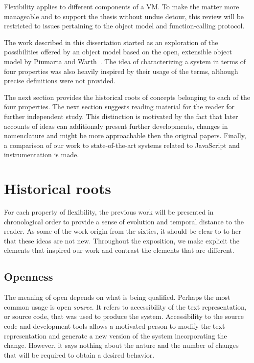 Flexibility applies to different components of a VM. To make the matter more
manageable and to support the thesis without undue detour, this review will be
restricted to issues pertaining to the object model and function-calling
protocol. 

The work described in this dissertation started as an exploration of the
possibilities offered by an object model based on the open, extensible object
model by Piumarta and Warth~\cite{Piumarta:2008}. The idea of characterizing a
system in terms of four properties was also heavily inspired by their usage of
the terms, although precise definitions were not provided.

The next section provides the historical roots of concepts belonging to each of
the four properties. The next section suggests reading material for the reader
for further independent study. This distinction is motivated by the fact that
later accounts of ideas can additionaly present further developments, changes
in nomenclature and might be more approachable then the original papers.
Finally, a comparison of our work to state-of-the-art systems related to
JavaScript and instrumentation is made.

\section{Historical roots}

For each property of flexibility, the previous work will be presented in
chronological order to provide a sense of evolution and temporal distance to
the reader. As some of the work origin from the sixties, it should be clear to
to her that these ideas are not new. Throughout the exposition, we make
explicit the elements that inspired our work and contrast the elements that are
different.

\subsection{Openness}

The meaning of open depends on what is being qualified. Perhaps the most common
usage is open \textit{source}. It refers to accessibility of the text
representation, or source code, that was used to produce the system.
Accessibility to the source code and development tools allows a motivated
person to modify the text representation and generate a new version of the
system incorporating the change. However, it says nothing about the nature and
the number of changes that will be required to obtain a desired behavior.

